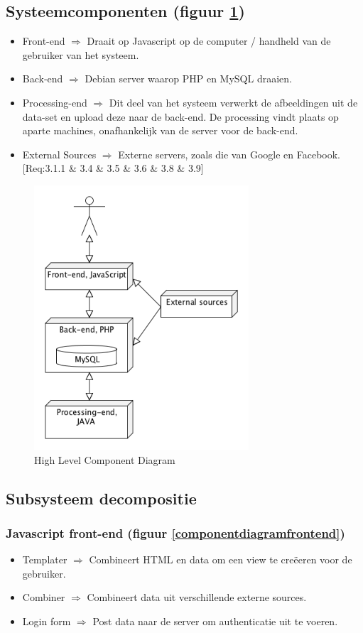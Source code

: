 \documentclass[a4paper,10pt]{article}
\begin{document}
	\subsection{Systeemcomponenten (figuur \ref{componentdiagramhighlevel})}
	\begin{itemize}
		\item Front-end $\Rightarrow$ Draait op Javascript op de computer / handheld van de gebruiker van het systeem.
		\item Back-end $\Rightarrow$ Debian server waarop PHP en MySQL draaien.
		\item Processing-end $\Rightarrow$ Dit deel van het systeem verwerkt de afbeeldingen uit de data-set en upload deze naar de back-end. De processing vindt plaats op aparte machines, onafhankelijk van de server voor de back-end.
		\item External Sources $\Rightarrow$ Externe servers, zoals die van Google en Facebook. [Req:3.1.1 \& 3.4 \& 3.5 \& 3.6 \& 3.8 \& 3.9]

	\end{itemize}
	\begin{figure}[ht!]
	\centering
	\includegraphics[width=8cm]{componentDiagram_highlevel.png}
	\caption{High Level Component Diagram \label{componentdiagramhighlevel}}
	\end{figure}
	
	\subsection{Subsysteem decompositie}
		\subsubsection{Javascript front-end (figuur \ref{componentdiagramfrontend})}
		\begin{itemize}
			\item Templater $\Rightarrow$ Combineert HTML en data om een view te cre\"eeren voor de gebruiker.
			\item Combiner $\Rightarrow$ Combineert data uit verschillende externe sources.
			\item Login form $\Rightarrow$ Post data naar de server om authenticatie uit te voeren.
		\end{itemize}
\end{document}
